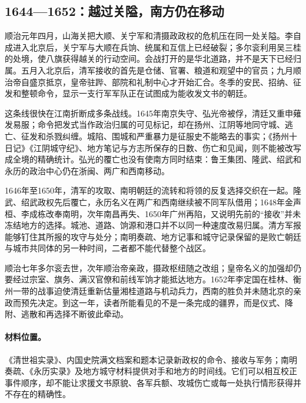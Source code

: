 \subsection{1644—1652：越过关隘，南方仍在移动}

顺治元年四月，山海关把大顺、关宁军和清摄政政权的危机压在同一处关隘。李自成进入北京后，关宁军与大顺在兵饷、统属和互信上已经破裂；多尔衮利用吴三桂的处境，使八旗获得越关的行动空间。会战打开的是华北道路，并不是天下已经归属。五月入北京后，清军接收的首先是仓储、官署、粮道和观望中的官员；九月顺治帝自盛京抵京，皇帝驻跸、部院和礼制中心才开始汇合。冬季的安民、招纳、征发和整顿命令，显示一支行军军队正在试图成为能收发文书的朝廷。

这条线很快在江南折断成多条战线。1645年南京失守、弘光帝被俘，清廷又重申薙发易服；命令把发式当作政治归属的可见标记，却在扬州、江阴等地同守城、逃亡、征发和杀戮纠缠。城陷、围城和严重暴力是征服史不能略去的事实；《扬州十日记》《江阴城守纪》、地方笔记与方志所保存的日数、伤亡和见闻，则不能被改写成全境的精确统计。弘光的覆亡也没有使南方同时结束：鲁王集团、隆武、绍武和永历的政治中心仍在浙闽、两广和西南移动。

1646年至1650年，清军的攻取、南明朝廷的流转和将领的反复选择交织在一起。隆武、绍武政权先后覆亡，永历名义在两广和西南继续被不同军队借用；1648年金声桓、李成栋改奉南明，次年南昌再失、1650年广州再陷，又说明先前的“接收”并未冻结地方的选择。城池、道路、饷源和港口并不以同一种速度改易归属。清方军报能够钉住其所报的攻守与处分；南明奏疏、地方记事和城守记录保留的是败亡朝廷与城市共同体的另一种时间，二者都不能代替整个战区。

顺治七年多尔衮去世，次年顺治帝亲政，摄政枢纽随之改组；皇帝名义的加强却仍要经过宗室、旗务、满汉官僚和前线军饷才能抵达地方。1652年李定国在桂林、衡州一带的战事迫使清廷重新估量湘桂道路与机动兵力，西南的胜负并未随北京的亲政而预先决定。到这一年，读者所能看见的不是一条完成的疆界，而是仪式、降附、逃散和再选择不断彼此牵动。

\paragraph{材料位置。} 《清世祖实录》、内国史院满文档案和题本记录新政权的命令、接收与军务；南明奏疏、《永历实录》及地方城守材料提供对手和地方的时间线。它们可以相互校正事件顺序，却不能让求援文书原貌、各军兵额、攻城伤亡或每一处执行情形获得并不存在的精确性。




